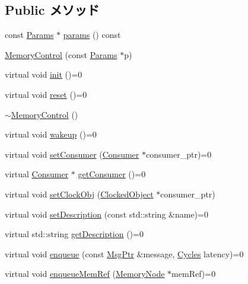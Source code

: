 \subsection*{Public メソッド}
\begin{DoxyCompactItemize}
\item 
const \hyperlink{classMemoryControl_aec6d67eaecba2a2311edc4c4c78fb0f5}{Params} $\ast$ \hyperlink{classMemoryControl_acd3c3feb78ae7a8f88fe0f110a718dff}{params} () const 
\item 
\hyperlink{classMemoryControl_a189a6ca42c937f0d9645cd5ea91be48f}{MemoryControl} (const \hyperlink{classMemoryControl_aec6d67eaecba2a2311edc4c4c78fb0f5}{Params} $\ast$p)
\item 
virtual void \hyperlink{classMemoryControl_ab5be7e5a13ea77d59aac45d21dceb6a0}{init} ()=0
\item 
virtual void \hyperlink{classMemoryControl_a20dcbdfbd0ec77afc802522bb7e379c1}{reset} ()=0
\item 
\hyperlink{classMemoryControl_a2e5f16844fdb309595860b4a79f17b67}{$\sim$MemoryControl} ()
\item 
virtual void \hyperlink{classMemoryControl_a623e3e7d1b1c725d70009f7b01a421b9}{wakeup} ()=0
\item 
virtual void \hyperlink{classMemoryControl_ac57bc43eacdddc1423b4f98ead12fd1c}{setConsumer} (\hyperlink{classConsumer}{Consumer} $\ast$consumer\_\-ptr)=0
\item 
virtual \hyperlink{classConsumer}{Consumer} $\ast$ \hyperlink{classMemoryControl_acb101bbbf38f858442ec618e9705d039}{getConsumer} ()=0
\item 
virtual void \hyperlink{classMemoryControl_a18a6b7f310731164a6a1509768b93eab}{setClockObj} (\hyperlink{classClockedObject_1_1ClockedObject}{ClockedObject} $\ast$consumer\_\-ptr)
\item 
virtual void \hyperlink{classMemoryControl_aaf16ee4e399ebed0a6434dd085a6fc10}{setDescription} (const std::string \&name)=0
\item 
virtual std::string \hyperlink{classMemoryControl_a907d681c378517c972b738f4286c25c5}{getDescription} ()=0
\item 
virtual void \hyperlink{classMemoryControl_a8295a9f6c98555275292b9c1296ea35a}{enqueue} (const \hyperlink{classRefCountingPtr}{MsgPtr} \&message, \hyperlink{classCycles}{Cycles} latency)=0
\item 
virtual void \hyperlink{classMemoryControl_a8c508812a5b1b935117dc32877229599}{enqueueMemRef} (\hyperlink{classMemoryNode}{MemoryNode} $\ast$memRef)=0
\item 

\end{DoxyCompactItemize}
